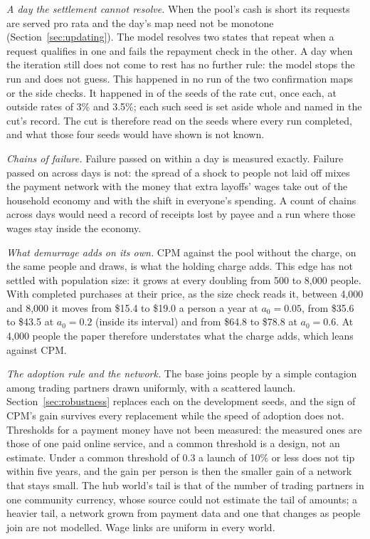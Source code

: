 \emph{A day the settlement cannot resolve.} When the pool's cash is short its requests are served pro rata and the
day's map need not be monotone (Section~\ref{sec:updating}). The model resolves two states that repeat when a
request qualifies in one and fails the repayment check in the other. A day when the iteration still does not
come to rest has no further rule: the model stops the run and does not guess. This happened in no run of the two
confirmation maps or the side checks. It happened in \CutSeedsAside{} of the \CutSeedsTried{} seeds of
the rate cut, once each, at outside rates of 3\% and 3.5\%; each such seed is set aside whole and named in the
cut's record. The cut is therefore read on the seeds where every run completed, and what those four seeds would
have shown is not known.

\emph{Chains of failure.} Failure passed on within a day is measured exactly. Failure passed on across days is not:
the spread of a shock to people not laid off mixes the payment network with the money that extra layoffs'
wages take out of the household economy and with the shift in everyone's spending. A count of chains across days
would need a record of receipts lost by payee and a run where those wages stay inside the economy.

\emph{What demurrage adds on its own.} CPM against the pool without the charge, on the same people and draws, is
what the holding charge adds. This edge has not settled with population size: it grows at every doubling from 500 to
8,000 people. With completed purchases at their price, as the size check reads it, between 4,000 and 8,000
it moves from \$15.4 to \$19.0 a person a year at $a_{0} = 0.05$, from
\$35.6 to \$43.5 at $a_{0} = 0.2$ (inside its interval) and from \$64.8 to \$78.8 at $a_{0} = 0.6$. At 4,000 people the paper therefore understates what the
charge adds, which leans against CPM.

\emph{The adoption rule and the network.} The base joins people by a simple contagion among trading partners drawn
uniformly, with a scattered launch. Section~\ref{sec:robustness} replaces each on the development seeds, and the sign
of CPM's gain survives every replacement while the speed of adoption does not. Thresholds for a payment money have
not been measured: the measured ones are those of one paid online service, and a common threshold is a design, not
an estimate. Under a common threshold of 0.3 a launch of 10\% or less does not tip within five years, and the gain
per person is then the smaller gain of a network that stays small. The hub world's tail is that of the number of
trading partners in one community currency, whose source could not estimate the tail of amounts; a heavier tail, a
network grown from payment data and one that changes as people join are not modelled. Wage links are uniform in
every world.

